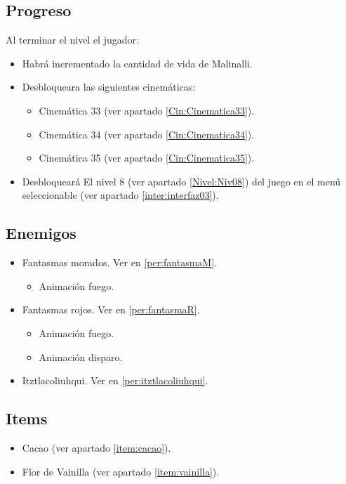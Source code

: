 	\subsection{Progreso}
	Al terminar el nivel el jugador:
\begin{itemize}
        \item Habrá incrementado la cantidad de vida de Malinalli. 
        \item Desbloqueara las siguientes cinemáticas:
\begin{itemize}
        \item Cinemática 33 (ver apartado \ref{Cin:Cinematica33}). 
        \item Cinemática 34 (ver apartado \ref{Cin:Cinematica34}).
        \item Cinemática 35 (ver apartado \ref{Cin:Cinematica35}).
\end{itemize}
        \item Desbloqueará El nivel 8 (ver apartado  \ref{Nivel:Niv08}) del juego en el menú seleccionable (ver apartado \ref{inter:interfaz03}).
\end{itemize} 
	\subsection{Enemigos}
	\begin{itemize}
		\item Fantasmas morados. Ver en \ref{per:fantasmaM}.
			\begin{itemize}
				\item Animación fuego.
			\end{itemize}
		\item Fantasmas rojos. Ver en \ref{per:fantasmaR}.
		\begin{itemize}
				\item Animación fuego.
				\item Animación disparo.
			\end{itemize}
		\item Itztlacoliuhqui. Ver en \ref{per:itztlacoliuhqui}.
	\end{itemize}
	\subsection{Items}
\begin{itemize}
        \item   Cacao (ver apartado \ref{item:cacao}).
        \item Flor de Vainilla (ver apartado \ref{item:vainilla}).
\end{itemize}
